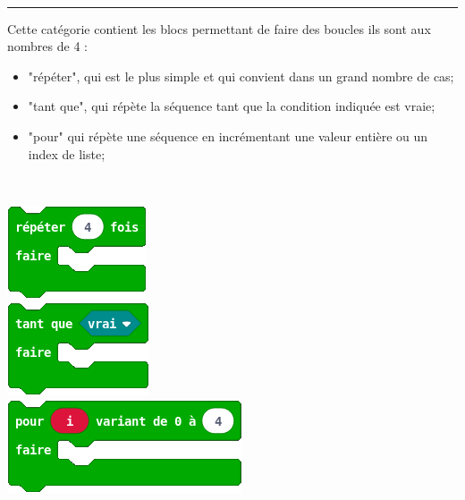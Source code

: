 \begin{minipage}[t]{0.75\linewidth}

    \begin{blocBoucle}\\
      \rule{-0.25em}{2em}
      Cette catégorie contient les blocs permettant de faire des boucles ils sont aux nombres de 4 :

      \begin{itemize}
        \item "répéter", qui est le plus simple et qui convient dans un grand nombre de cas;
        \item  "tant que", qui répète la séquence tant que la condition indiquée est vraie;
        \item "pour" qui répète une séquence en incrémentant une valeur entière ou un index de liste;
      \end{itemize}

    \end{blocBoucle}

\end{minipage}
\hfill
\begin{minipage}[t]{0.25\linewidth}~\\
  \vspace{5mm}


  	\includegraphics[scale=0.4]{res/blocsMkCd/MB_makecode_boucles-repeter.png}\\[0.5em]
  	\includegraphics[scale=0.4]{res/blocsMkCd/MB_makecode_boucles-tantque.png}\\[0.5em]
    \includegraphics[scale=0.4]{res/blocsMkCd/MB_makecode_boucles-parcourir.png}


\end{minipage}

